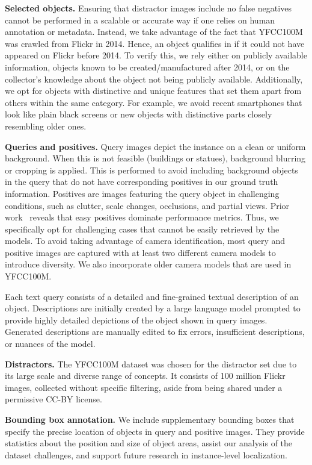 \noindent\textbf{Selected objects.}
Ensuring that distractor images include no false negatives cannot be performed in a scalable or accurate way if one relies on human annotation or metadata. 
Instead, we take advantage of the fact that YFCC100M was crawled from Flickr in 2014.
Hence, an object qualifies in \ours if it could not have appeared on Flickr before 2014. To verify this, we rely either on publicly available information, \eg objects known to be created/manufactured after 2014, or on the collector's knowledge about the object not being publicly available. Additionally, we opt for objects with distinctive and unique features that set them apart from others within the same category. For example, we avoid recent smartphones that look like plain black screens or new objects with distinctive parts closely resembling older ones. 

\noindent\textbf{Queries and positives.}
Query images depict the instance on a clean or uniform background. When this is not feasible (\eg buildings or statues), background blurring or cropping is applied. This is performed to avoid including background objects in the query that do not have corresponding positives in our ground truth information. 
Positives are images featuring the query object in challenging conditions, such as clutter, scale changes, occlusions, and partial views. 
Prior work~\cite{rit+18} reveals that easy positives dominate performance metrics. Thus, we specifically opt for challenging cases that cannot be easily retrieved by the models.
To avoid taking advantage of camera identification, most query and positive images are captured with at least two different camera models to introduce diversity. We also incorporate older camera models that are used in YFCC100M.

Each text query consists of a detailed and fine-grained textual description of an object. 
Descriptions are initially created by a large language model prompted to provide highly detailed depictions of the object shown in query images. Generated descriptions are manually edited to fix errors, insufficient descriptions, or nuances of the model.

\noindent\textbf{Distractors.}
The YFCC100M dataset was chosen for the distractor set due to its large scale and diverse range of concepts. It consists of 100 million Flickr images, collected without specific filtering, aside from being shared under a permissive CC-BY license.

\noindent\textbf{Bounding box annotation.} We include supplementary bounding boxes that specify the precise location of objects in query and positive images. 
They provide statistics about the position and size of object areas, assist our analysis of the dataset challenges, and support future research in instance-level localization.

